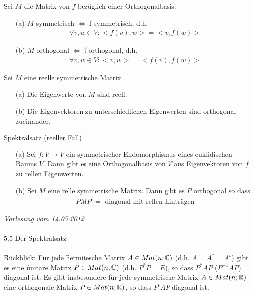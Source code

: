 \begin{satz} %
\label{satz554}
Sei $M$ die Matrix von $f$ bezüglich einer Orthogonalbasis.
\begin{itemize}
\item[(a)] $M$ symmetrisch $\Leftrightarrow$ f symmetrisch, d.h. 
\begin{align}
\forall v, w \in V: <f(v), w> = <v, f(w)> 
\end{align}
\item[(b)] $M$ orthogonal $\Leftrightarrow$ f orthogonal, d.h. 
\begin{align}
\forall v, w \in V: <v, w> = <f(v), f(w)> 
\end{align}
\end{itemize}
\end{satz}

\begin{satz} %
\label{satz555}
Sei $M$ eine reelle symmetrische Matrix.
\begin{itemize}
\item[(a)] Die Eigenwerte von $M$ sind reell.
\item[(b)] Die Eigenvektoren zu unterschiedlichen Eigenwerten sind orthogonal zueinander.
\end{itemize}
\end{satz}

\begin{satz}{Spektralsatz (reeller Fall)} %
\label{satz556}
\begin{itemize}
\item[(a)] Sei $f: V \rightarrow V$ ein symmetrischer Endomorphismus eines euklidischen Raums $V$. Dann gibt es eine Orthogonalbasis von $V$ aus Eigenvektoren von $f$ zu rellen Eigenwerten.
\item[(b)] Sei $M$ eine relle symmetrische Matrix. Dann gibt es $P$ orthogonal so dass
\begin{align}
PMP^{t} = \text{ diagonal mit rellen Einträgen}
\end{align}
\end{itemize}
\end{satz}

\newpage
\noindent \textit{Vorlesung vom 14.05.2012} \\\\
\Large \f{5.5 Der Spektralsatz} \normalsize \\\\
\f{Rückblick:} Für jede \f{hermitesche} Matrix $A \in Mat(n; \mathbb{C})$ (d.h. $A = A^{*} = A^{t}$) gibt es eine \f{unitäre} Matrix $P \in Mat(n; \mathbb{C})$ (d.h. $P^{*} P = E$), so dass $P^{*} AP$ ($P^{-1} AP$) \f{diagonal} ist. Es gibt insbesondere für jede \f{symmetrische} Matrix $A \in Mat(n; \mathbb{R})$ eine \f{orthogonale} Matrix $P \in Mat(n; \mathbb{R})$, so dass $P^{t} A P$ diagonal ist.

